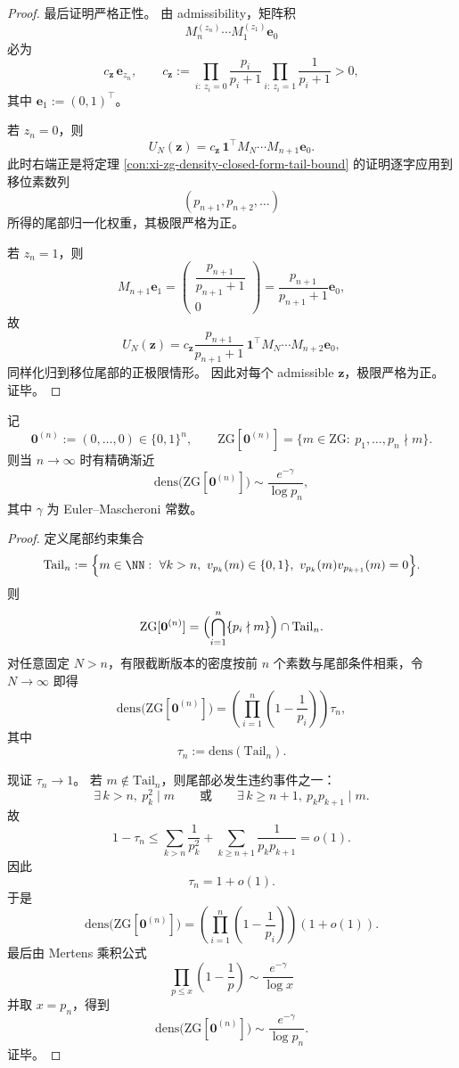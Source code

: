 \begin{proof}
最后证明严格正性。
由 admissibility，矩阵积
\[
M_n^{(z_n)}\cdots M_1^{(z_1)}\mathbf e_0
\]
必为
\[
c_{\mathbf z}\,\mathbf e_{z_n},
\qquad
c_{\mathbf z}:=
\prod_{i:\ z_i=0}\frac{p_i}{p_i+1}
\prod_{i:\ z_i=1}\frac1{p_i+1}
>0,
\]
其中 \(\mathbf e_1:=(0,1)^\top\)。

若 \(z_n=0\)，则
\[
U_N(\mathbf z)=
c_{\mathbf z}\,\mathbf 1^\top M_N\cdots M_{n+1}\mathbf e_0.
\]
此时右端正是将定理 \ref{con:xi-zg-density-closed-form-tail-bound} 的证明逐字应用到移位素数列
\[
(p_{n+1},p_{n+2},\dots)
\]
所得的尾部归一化权重，其极限严格为正。

若 \(z_n=1\)，则
\[
M_{n+1}\mathbf e_1
=
\begin{pmatrix}
\dfrac{p_{n+1}}{p_{n+1}+1}\\[2mm]
0
\end{pmatrix}
=
\frac{p_{n+1}}{p_{n+1}+1}\mathbf e_0,
\]
故
\[
U_N(\mathbf z)=
c_{\mathbf z}\frac{p_{n+1}}{p_{n+1}+1}\,
\mathbf 1^\top M_N\cdots M_{n+2}\mathbf e_0,
\]
同样化归到移位尾部的正极限情形。
因此对每个 admissible \(\mathbf z\)，极限严格为正。证毕。
\end{proof}

\begin{theorem}[零前缀柱集的对数级自然密度律]\label{thm:xi-time-part60f-zg-zero-prefix-log-density}
记
\[
\mathbf 0^{(n)}:=(0,\dots,0)\in\{0,1\}^n,
\qquad
\mathrm{ZG}[\mathbf 0^{(n)}]
=
\{m\in\mathrm{ZG}:\ p_1,\dots,p_n\nmid m\}.
\]
则当 \(n\to\infty\) 时有精确渐近
\[
\mathrm{dens}\bigl(\mathrm{ZG}[\mathbf 0^{(n)}]\bigr)
\sim
\frac{e^{-\gamma}}{\log p_n},
\]
其中 \(\gamma\) 为 Euler--Mascheroni 常数。
\end{theorem}
\begin{proof}
定义尾部约束集合
\[
\mathrm{Tail}_n
:=
\Bigl\{
m\in\NN:\ 
\forall k>n,\ v_{p_k}(m)\in\{0,1\},\
v_{p_k}(m)v_{p_{k+1}}(m)=0
\Bigr\}.
\]
则
\[
\mathrm{ZG}[\mathbf 0^{(n)}]
=
\Bigl(\bigcap_{i=1}^{n}\{p_i\nmid m\}\Bigr)\cap \mathrm{Tail}_n.
\]
对任意固定 \(N>n\)，有限截断版本的密度按前 \(n\) 个素数与尾部条件相乘，令 \(N\to\infty\) 即得
\[
\mathrm{dens}\bigl(\mathrm{ZG}[\mathbf 0^{(n)}]\bigr)
=
\left(\prod_{i=1}^{n}\left(1-\frac1{p_i}\right)\right)\tau_n,
\]
其中
\[
\tau_n:=\mathrm{dens}(\mathrm{Tail}_n).
\]

现证 \(\tau_n\to 1\)。
若 \(m\notin \mathrm{Tail}_n\)，则尾部必发生违约事件之一：
\[
\exists\,k>n,\ p_k^2\mid m
\qquad\text{或}\qquad
\exists\,k\ge n+1,\ p_kp_{k+1}\mid m.
\]
故
\[
1-\tau_n
\le
\sum_{k>n}\frac1{p_k^2}
+
\sum_{k\ge n+1}\frac1{p_kp_{k+1}}
=o(1).
\]
因此
\[
\tau_n=1+o(1).
\]
于是
\[
\mathrm{dens}\bigl(\mathrm{ZG}[\mathbf 0^{(n)}]\bigr)
=
\left(\prod_{i=1}^{n}\left(1-\frac1{p_i}\right)\right)(1+o(1)).
\]
最后由 Mertens 乘积公式
\[
\prod_{p\le x}\left(1-\frac1p\right)\sim \frac{e^{-\gamma}}{\log x}
\]
并取 \(x=p_n\)，得到
\[
\mathrm{dens}\bigl(\mathrm{ZG}[\mathbf 0^{(n)}]\bigr)
\sim
\frac{e^{-\gamma}}{\log p_n}.
\]
证毕。
\end{proof}

